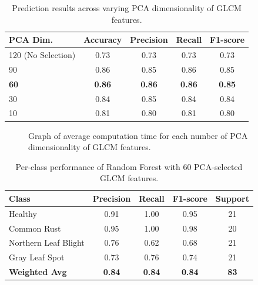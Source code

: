 \documentclass[10pt,a4paper]{article}
\begin{document}
\begin{table}[ht]
    \centering
    \caption{Prediction results across varying PCA dimensionality of GLCM features.}
    \begin{tabular}{@{}lcccc@{}}
        \toprule
        \textbf{PCA Dim.} & \textbf{Accuracy} & \textbf{Precision} & \textbf{Recall} & \textbf{F1-score} \\
        \midrule
        120 (No Selection) & 0.73 & 0.73 & 0.73 & 0.73 \\
        90                 & 0.86 & 0.85 & 0.86 & 0.85 \\
        \textbf{60}        & \textbf{0.86} & \textbf{0.86} & \textbf{0.86} & \textbf{0.85} \\
        30                 & 0.84 & 0.85 & 0.84 & 0.84 \\
        10                 & 0.81 & 0.80 & 0.81 & 0.80 \\
        \bottomrule
    \end{tabular}
    \label{table:1}
\end{table}

\begin{figure}[h]
    \centering
    \caption{Graph of average computation time for each number of PCA dimensionality of GLCM features.}
    \label{fig:time-results}
\end{figure}

\begin{table}[ht]
    \centering
    \caption{Per-class performance of Random Forest with 60 PCA-selected GLCM features.}
    \begin{tabular}{@{}lcccc@{}}
        \toprule
        \textbf{Class} & \textbf{Precision} & \textbf{Recall} & \textbf{F1-score} & \textbf{Support} \\
        \midrule
        Healthy               & 0.91 & 1.00 & 0.95 & 21 \\
        Common Rust           & 0.95 & 1.00 & 0.98 & 20 \\
        Northern Leaf Blight  & 0.76 & 0.62 & 0.68 & 21 \\
        Gray Leaf Spot        & 0.73 & 0.76 & 0.74 & 21 \\
        \midrule
        \textbf{Weighted Avg} & \textbf{0.84} & \textbf{0.84} & \textbf{0.84} & \textbf{83} \\
        \bottomrule
    \end{tabular}
    \label{table:2}
\end{table}
\end{document}
